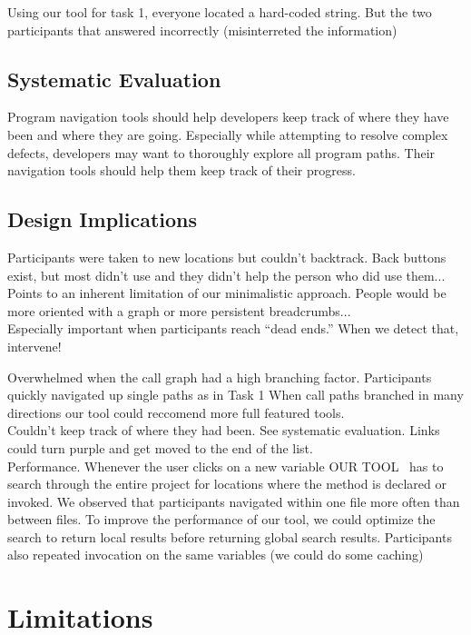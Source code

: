 \documentclass[conference]{IEEEtran}
\newcommand{\toolName}{OUR TOOL}
\begin{document}
Using our tool for task 1, everyone located a hard-coded string. But the two participants that answered incorrectly (misinterreted the information)



\subsection{Systematic Evaluation}
Program navigation tools should help developers keep track of where they have been and where they are going. Especially while attempting to resolve complex defects, developers may want to thoroughly explore all program paths. Their navigation tools should help them keep track of their progress.

\subsection{Design Implications}

Participants were taken to new locations but couldn't backtrack.
	Back buttons exist, but most didn't use and they didn't help the person who did use them...
	Points to an inherent limitation of our minimalistic approach. People would be more oriented with a graph or more persistent breadcrumbs...\\
	Especially important when participants reach ``dead ends.'' When we detect that, intervene!
	
Overwhelmed when the call graph had a high branching factor.
	Participants quickly navigated up single paths as in Task 1
	When call paths branched in many directions our tool could reccomend more full featured tools.\\
Couldn't keep track of where they had been.
	See systematic evaluation. Links could turn purple and get moved to the end of the list.\\
Performance.
	Whenever the user clicks on a new variable \toolName~ has to search through the entire project for locations where the method is declared or invoked. We observed that participants navigated within one file more often than between files. To improve the performance of our tool, we could optimize the search to return local results before returning global search results.	Participants also repeated invocation on the same variables (we could do some caching)


\section{Limitations}
\end{document}
